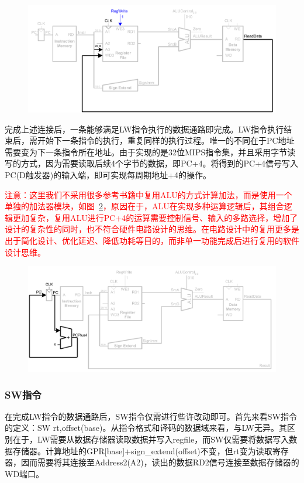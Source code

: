 \begin{figure}[htbp]
	\centering
	\includegraphics[width=1.0\textwidth]{image/5_lw_memory_read.pdf}
	\caption{\label{fig:5_lw_memory_read}}
\end{figure}

完成上述连接后，一条能够满足LW指令执行的数据通路即完成。LW指令执行结束后，需开始下一条指令的执行，重复同样的执行过程。唯一的不同在于PC地址需要变为下一条指令所在地址。由于实现的是32位MIPS指令集，并且采用字节读写的方式，因为需要读取后续4个字节的数据，即PC+4。将得到的PC+4信号写入PC(D触发器)的输入端，即可实现每周期地址+4的操作。

\textcolor{red}{注意：这里我们不采用很多参考书籍中复用ALU的方式计算加法，而是使用一个单独的加法器模块，如图~\ref{fig:6_lw_pc_increment}，原因在于，ALU在实现多种运算逻辑后，其组合逻辑更加复杂，复用ALU进行PC+4的运算需要控制信号、输入的多路选择，增加了设计的复杂性的同时，也不符合硬件电路设计的思维。在电路设计中的复用更多是出于简化设计、优化延迟、降低功耗等目的，而非单一功能完成后进行复用的软件设计思维。}

\begin{figure}[htbp]
	\centering
	\includegraphics[width=1.0\textwidth]{image/6_lw_pc_increment.pdf}
	\caption{\label{fig:6_lw_pc_increment}}
\end{figure}

\subsubsection{SW指令}
在完成LW指令的数据通路后，SW指令仅需进行些许改动即可。首先来看SW指令的定义：SW rt,offset(base)。从指令格式和译码的数据域来看，与LW无异。其区别在于，LW需要从数据存储器读取数据并写入regfile，而SW仅需要将数据写入数据存储器。计算地址的GPR[base]+sign\_extend(offset)不变，但rt变为读取寄存器，因而需要将其连接至Address2(A2)，读出的数据RD2信号连接至数据存储器的WD端口。

